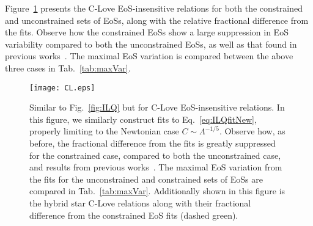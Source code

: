 \documentclass[prd,twocolumn,nofootinbib,superscriptaddress,amsmath,amssymb]{revtex4-1}
\begin{document}
Figure~\ref{fig:clove} presents the C-Love EoS-insensitive relations for both the constrained and unconstrained sets of EoSs, along with the relative fractional difference from the fits. 
Observe how the constrained EoSs show a large suppression in EoS variability compared to both the unconstrained EoSs, as well as that found in previous works~\cite{Yagi:binLove}.
The maximal EoS variation is compared between the above three cases in Tab.~\ref{tab:maxVar}.
\begin{figure}
\begin{center} 
\texttt{[image: CL.eps]}
\end{center}
\caption{
Similar to Fig.~\ref{fig:ILQ} but for C-Love EoS-insensitive relations.
In this figure, we similarly construct fits to  Eq.~\ref{eq:ILQfitNew}, properly limiting to the Newtonian case $C \sim \Lambda^{-1/5}$.
Observe how, as before, the fractional difference from the fits is greatly suppressed for the constrained case, compared to both the unconstrained case, and results from previous works~\cite{Yagi:binLove}.
The maximal EoS variation from the fits for the unconstrained and constrained sets of EoSs are compared in Tab.~\ref{tab:maxVar}.
Additionally shown in this figure is the hybrid star C-Love relations along with their fractional difference from the constrained EoS fits (dashed green).
}
\label{fig:clove}
\end{figure} 
\end{document}
